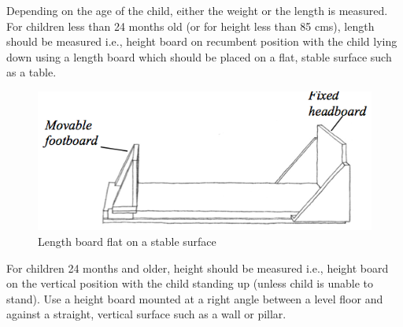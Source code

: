 \documentclass[
  12pt,
]{book}
\begin{document}
Depending on the age of the child, either the weight or the length is measured. For children less than 24 months old (or for height less than 85 cms), length should be measured i.e., height board on recumbent position with the child lying down using a length board which should be placed on a flat, stable surface such as a table.

\begin{figure}

{\centering \includegraphics[width=7.28in]{images/heightBoard03} 

}

\caption{Length board flat on a stable surface}\label{fig:height04}
\end{figure}

For children 24 months and older, height should be measured i.e., height board on the vertical position with the child standing up (unless child is unable to stand). Use a height board mounted at a right angle between a level floor and against a straight, vertical surface such as a wall or pillar.
\end{document}
